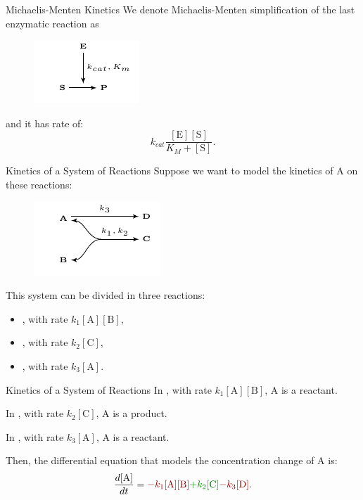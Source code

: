 \documentclass{beamer}
\begin{document}
\begin{frame}{Michaelis-Menten Kinetics}
We denote Michaelis-Menten simplification of the last enzymatic reaction
as
\begin{figure}
\includegraphics[scale=1.5]{fundamental_concepts/michaelis_menten_reaction.pdf}
\end{figure}
\pause
and it has rate of:
\begin{equation*}
    k_{cat} \frac{[\text{E}][\text{S}]}{K_M + [\text{S}]}.
\end{equation*}
\end{frame}


\begin{frame}{Kinetics of a System of Reactions}
Suppose we want to model the kinetics of A on these reactions:
\begin{figure}
    \includegraphics[scale=1.5]{fundamental_concepts/system_reactions.pdf}
\end{figure}
This system can be divided in three reactions:
\begin{itemize}
    \pause
    \item{, with rate $k_1[\text{A}][\text{B}]$,}
    \pause
    \item{, with rate $k_2[\text{C}]$,}
    \pause
    \item{, with rate $k_3[\text{A}]$.}
\end{itemize}
\end{frame}

\begin{frame}{Kinetics of a System of Reactions}
In , with rate 
{\color{red!50!black}$k_1[\text{A}][\text{B}]$}, A is a reactant.
\pause

In , with rate 
{\color{green!50!black}$k_2[\text{C}]$}, A is a product.
\pause

In , with rate 
{\color{red!50!black}$k_3[\text{A}]$}, A is a reactant.
\pause

Then, the differential equation that models the concentration change of 
A is:
\pause
\begin{equation*}
    \frac{d[\text{A}]}{dt} = 
        {\color{red!50!black}- k_1[\text{A}][\text{B}]}
        {\color{green!50!black}+ k_2[\text{C}]}
        {\color{red!50!black}- k_3[\text{D}]}.
\end{equation*}
\end{frame}
\end{document}
